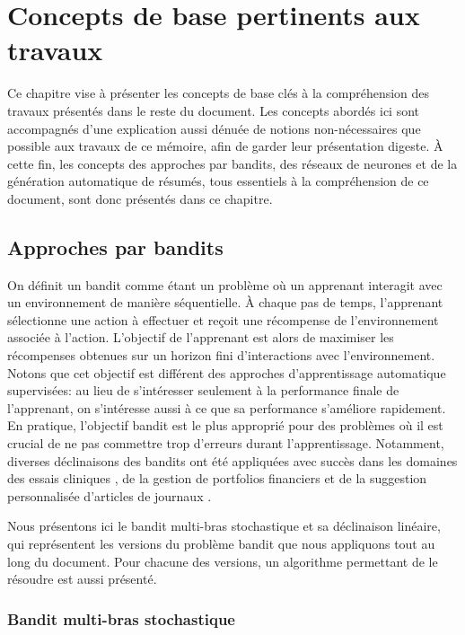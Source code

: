 \chapter{Concepts de base pertinents aux travaux}     %
\label{chap:prerequis}                   %

Ce chapitre vise à présenter les concepts de base clés à la compréhension des travaux
présentés dans le reste du document.
Les concepts abordés ici sont accompagnés d'une explication aussi dénuée de notions
non-nécessaires que possible aux travaux de ce mémoire, afin de garder leur présentation
digeste.
À cette fin, les concepts des approches par bandits, des réseaux de neurones et de la
génération automatique de résumés, tous essentiels à la compréhension de ce document,
sont donc présentés dans ce chapitre.

\section{Approches par bandits}
\label{sec:bandits}

On définit un bandit \citep{banditalgs} comme étant un problème où un 
apprenant interagit avec un environnement de manière séquentielle.
À chaque pas de temps, l'apprenant sélectionne une action à effectuer et
reçoit une récompense de l'environnement associée à l'action.
L'objectif de l'apprenant est alors de maximiser les récompenses obtenues sur un horizon
fini d'interactions avec l'environnement.
Notons que cet objectif est différent des approches d'apprentissage automatique
supervisées: au lieu de s'intéresser seulement à la performance finale de
l'apprenant, on s'intéresse aussi à ce que sa performance s'améliore
rapidement.
En pratique, l'objectif bandit est le plus approprié pour des problèmes
où il est crucial de ne pas commettre trop d'erreurs durant l'apprentissage.
Notamment, diverses déclinaisons des bandits ont été appliquées avec succès dans
les domaines des essais cliniques \citep{kuleshov2014algorithms}, de
la gestion de portfolios financiers \citep{10.5555/2832249.2832384} et
de la suggestion personnalisée d'articles de journaux \citep{Li_2010}.

Nous présentons ici le bandit multi-bras stochastique et sa déclinaison linéaire,
qui représentent les versions du problème bandit que nous appliquons tout au long du document.
Pour chacune des versions, un algorithme permettant de le résoudre est aussi présenté.

\subsection{Bandit multi-bras stochastique}

